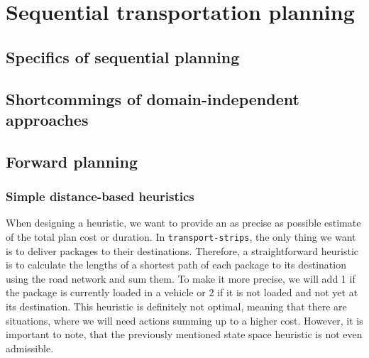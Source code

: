 \chapter{Sequential transportation planning}

\section{Specifics of sequential planning}


\section{Shortcommings of domain-independent approaches}


\section{Forward planning}




\subsection{Simple distance-based heuristics}

When designing a heuristic, we want to provide an as precise as possible estimate
of the total plan cost or duration.
In \texttt{transport-strips}, the only thing we want is to deliver packages to their destinations. Therefore, a straightforward heuristic is to calculate the lengths of a shortest
path of each package to its destination using the road network and sum them.
To make it more precise, we will add 1 if the package is currently loaded
in a vehicle or 2 if it is not loaded and not yet at its destination.
This heuristic is definitely not optimal, meaning that there are situations,
where we will need actions summing up to a higher cost.
However, it is important to note, that the previously mentioned state space heuristic 
is not even admissible.


